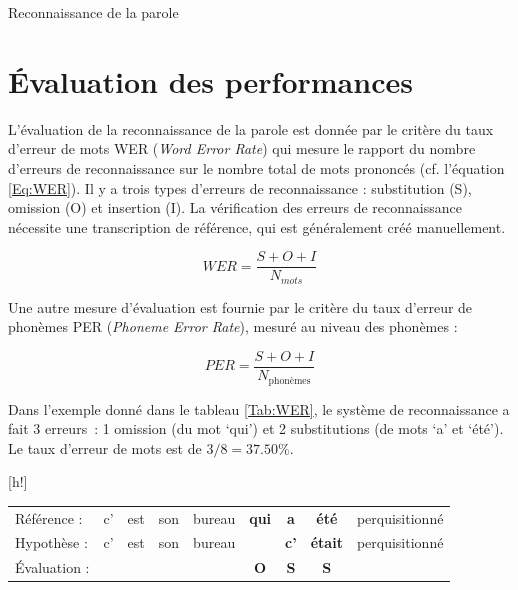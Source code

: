 \documentclass{style/these}
\makeatletter
\renewcommand\familydefault{ptm}
\renewenvironment{table}%
{ \renewcommand{\familydefault}{ptm}\selectfont
  \@float{table}}
  {\end@float}
\makeatother
\begin{document}
\begin{part}{Reconnaissance de la parole}
\section{Évaluation des performances}
\label{Sec:Eval}
\renewcommand{\rightmark}{Évaluation des performances}

L'évaluation de la reconnaissance de la parole est donnée par le critère du taux d'erreur de mots \acrshort{WER} (\textit{Word Error Rate}) qui mesure le rapport du nombre d'erreurs de reconnaissance sur le nombre total de mots prononcés (cf. l'équation \ref{Eq:WER}). Il y a trois types d'erreurs de reconnaissance : substitution (S), omission (O) et insertion (I). 
La vérification des erreurs de reconnaissance nécessite une transcription de référence, qui est généralement créé manuellement. 

\begin{equation}
	WER = \frac{S + O + I}{N_{mots}}
\label{Eq:WER}
\end{equation}

Une autre mesure d'évaluation est fournie par le critère du taux d'erreur de phonèmes \acrshort{PER} (\textit{Phoneme Error Rate}), mesuré au niveau des phonèmes :

\begin{equation}
	PER = \frac{S + O + I}{N_{\text{phonèmes}}}
\label{Eq:PER}
\end{equation}

Dans l'exemple donné dans le tableau \ref{Tab:WER}, le système de reconnaissance a fait 3 erreurs~: 1 omission (du mot `qui') et 2 substitutions (de mots `a' et `été'). Le taux d'erreur de mots est de $3/8=37.50\%$.

\begin{table}[h!]
\centering
\begin{tabular}{|lcccccccc|}
\hline
Référence :	& c' & est & son & bureau & \textbf{\color{darkgreen}qui} & \textbf{\color{blue}a}  & \textbf{\color{blue}été}   & perquisitionné	\\
Hypothèse :	& c' & est & son & bureau & 				  & \textbf{\color{blue}c'} & \textbf{\color{blue}était} & perquisitionné	\\ \hline
Évaluation :	&    &	   & 	 & 	  & \textbf{\color{darkgreen}O}   & \textbf{\color{blue}S}  & \textbf{\color{blue}S}	 &			\\ \hline
\end{tabular}
\caption{Évaluation d'un résultat du décodage}
\label{Tab:WER}
\end{table}


\end{part}
\end{document}
